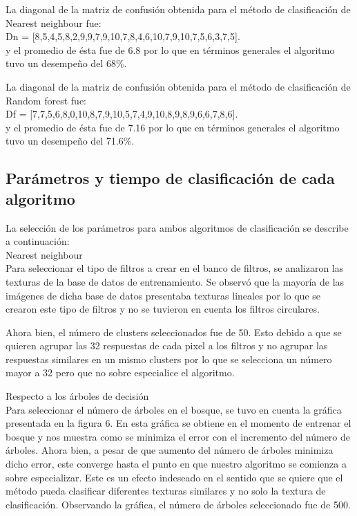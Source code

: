 \documentclass[10pt,twocolumn,letterpaper]{article}
\begin{document}
La diagonal de la matriz de confusión obtenida para el método de clasificación de Nearest neighbour fue:\\

Dn = [8,5,4,5,8,2,9,9,7,9,10,7,8,4,6,10,7,9,10,7,5,6,3,7,5].\\

y el promedio de ésta fue de 6.8 por lo que en términos generales el algoritmo tuvo un desempeño del 68\%.

La diagonal de la matriz de confusión obtenida para el método de clasificación de Random forest fue:\\

Df = [7,7,5,6,8,0,10,8,7,9,10,5,7,4,9,10,8,9,8,9,6,6,7,8,6].\\

y el promedio de ésta fue de 7.16 por lo que en términos generales el algoritmo tuvo un desempeño del 71.6\%.


\subsection{Parámetros y tiempo de clasificación de cada algoritmo}

La selección de los parámetros para ambos algoritmos de clasificación se describe a continuación:\\

Nearest neighbour\\

Para seleccionar el tipo de filtros a crear en el banco de filtros, se analizaron las texturas de la base de datos de entrenamiento. Se observó que la mayoría de las imágenes de dicha base de datos presentaba texturas lineales por lo que se crearon este tipo de filtros y no se tuvieron en cuenta los filtros circulares.

Ahora bien, el número de clusters seleccionados fue de 50. Esto debido a que se quieren agrupar las 32 respuestas de cada pixel a los filtros y no agrupar las respuestas similares en un mismo clusters por lo que se selecciona un número mayor a 32 pero que no sobre especialice el algoritmo.

Respecto a los árboles de decisión\\ 

Para seleccionar el número de árboles en el bosque, se tuvo en cuenta la gráfica presentada en la figura 6. En esta gráfica se obtiene en el momento de entrenar el bosque y nos muestra como se minimiza el error con el incremento del número de árboles. Ahora bien, a pesar de que aumento del número de árboles  minimiza dicho error, este converge hasta el punto en que nuestro algoritmo se comienza a sobre especializar. Este es un efecto indeseado en el sentido que se quiere que el método pueda clasificar diferentes texturas similares y no solo la textura de clasificación. Observando la gráfica, el número de árboles seleccionado fue de 500.
\end{document}

